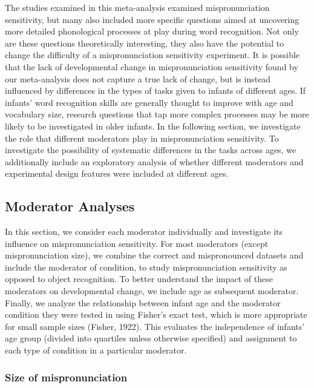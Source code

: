 \documentclass[man]{apa6}
\begin{document}
The studies examined in this meta-analysis examined mispronunciation sensitivity, but many also included more specific questions aimed at uncovering more detailed phonological processes at play during word recognition. Not only are these questions theoretically interesting, they also have the potential to change the difficulty of a mispronunciation sensitivity experiment. It is possible that the lack of developmental change in mispronunciation sensitivity found by our meta-analysis does not capture a true lack of change, but is instead influenced by differences in the types of tasks given to infants of different ages. If infants' word recognition skills are generally thought to improve with age and vocabulary size, research questions that tap more complex processes may be more likely to be investigated in older infants. In the following section, we investigate the role that different moderators play in mispronunciation sensitivity. To investigate the possibility of systematic differences in the tasks across ages, we additionally include an exploratory analysis of whether different moderators and experimental design features were included at different ages.

\hypertarget{moderator-analyses}{%
\subsection{Moderator Analyses}\label{moderator-analyses}}

In this section, we consider each moderator individually and investigate its influence on mispronunciation sensitivity. For most moderators (except mispronunciation size), we combine the correct and mispronounced datasets and include the moderator of condition, to study mispronunciation sensitivity as opposed to object recognition. To better understand the impact of these moderators on developmental change, we include age as subsequent moderator. Finally, we analyze the relationship between infant age and the moderator condition they were tested in using Fisher's exact test, which is more appropriate for small sample sizes (Fisher, 1922). This evaluates the independence of infants' age group (divided into quartiles unless otherwise specified) and assignment to each type of condition in a particular moderator.

\hypertarget{size-of-mispronunciation}{%
\subsubsection{Size of mispronunciation}\label{size-of-mispronunciation}}
\end{document}
